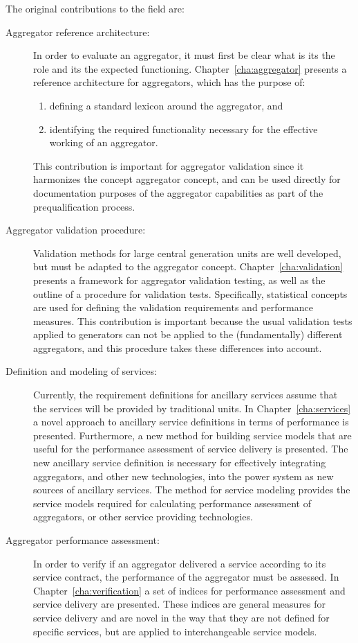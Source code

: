 The original contributions to the field are:
\begin{description}
	\item[Aggregator reference architecture:] In order to evaluate an aggregator, it must first be clear what is its the role and its the expected functioning. Chapter~\ref{cha:aggregator} presents a reference architecture for aggregators, which has the purpose of:
		\begin{enumerate}
			\item defining a standard lexicon around the aggregator, and
			\item identifying the required functionality necessary for the effective working of an aggregator.
		\end{enumerate}
		This contribution is important for aggregator validation since it harmonizes the concept aggregator concept, and can be used directly for documentation purposes of the aggregator capabilities as part of the prequalification process.%
	\item[Aggregator validation procedure:] Validation methods for large central generation units are well developed, but must be adapted to the aggregator concept. Chapter~\ref{cha:validation} presents a framework for aggregator validation testing, as well as the outline of a procedure for validation tests. Specifically, statistical concepts are used for defining the validation requirements and performance measures. This contribution is important because the usual validation tests applied to generators can not be applied to the (fundamentally) different aggregators, and this procedure takes these differences into account.
	\item[Definition and modeling of services:] Currently, the requirement definitions for ancillary services assume that the services will be provided by traditional units. In Chapter~\ref{cha:services} a novel approach to ancillary service definitions in terms of performance is presented. Furthermore, a new method for building service models that are useful for the performance assessment of service delivery is presented. The new ancillary service definition is necessary for effectively integrating aggregators, and other new technologies, into the power system as new sources of ancillary services. The method for service modeling provides the service models required for calculating performance assessment of aggregators, or other service providing technologies.
	\item[Aggregator performance assessment:] In order to verify if an aggregator delivered a service according to its service contract, the performance of the aggregator must be assessed. In Chapter~\ref{cha:verification} a set of indices for performance assessment and service delivery are presented. These indices are general measures for service delivery and are novel in the way that they are not defined for specific services, but are applied to interchangeable service models.
\end{description}

